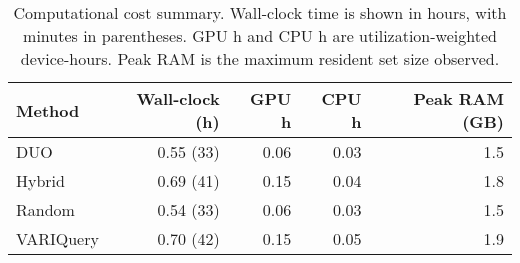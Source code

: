 \begin{table}[h]
  \centering
  \begin{tabular}{lrrrr}
    \toprule
    \textbf{Method} & \textbf{Wall-clock (h)} & \textbf{GPU h} & \textbf{CPU h} & \textbf{Peak RAM (GB)} \\
    \midrule
    DUO        & 0.55 (33)       & 0.06   & 0.03   & 1.5            \\
    Hybrid     & 0.69 (41)       & 0.15   & 0.04   & 1.8            \\
    Random     & 0.54 (33)       & 0.06   & 0.03   & 1.5            \\
    VARIQuery  & 0.70 (42)       & 0.15   & 0.05   & 1.9            \\
    \bottomrule
  \end{tabular}
  \caption{Computational cost summary. Wall-clock time is shown in hours, with minutes in parentheses. GPU h and CPU h are utilization-weighted device-hours. Peak RAM is the maximum resident set size observed.}
  \label{tab:results:overhead}
\end{table}